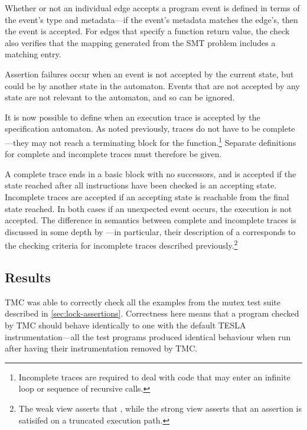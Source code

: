 Whether or not an individual edge accepts a program event is defined in terms of
the event's type and metadata---if the event's metadata matches the edge's, then
the event is accepted. For edges that specify a function return value, the check
also verifies that the mapping generated from the SMT problem includes a
matching entry.

Assertion failures occur when an event is not accepted by the current state, but
could be by another state in the automaton. Events that are not accepted by any
state are not relevant to the automaton, and so can be ignored.

It is now possible to define when an execution trace is accepted by the
specification automaton. As noted previously, traces do not have to be
complete---they may not reach a terminating block for the
function.\footnote{Incomplete traces are required to deal with code that may
enter an infinite loop or sequence of recursive calls.} Separate definitions for
complete and incomplete traces must therefore be given.

A complete trace ends in a basic block with no successors, and is accepted if
the state reached after all instructions have been checked is an accepting
state. Incomplete traces are accepted if an accepting state is reachable from
the final state reached. In both cases if an unexpected event occurs, the
execution is not accepted. The difference in semantics between complete and
incomplete traces is discussed in some depth by
\textcite{eisner_reasoning_2003}---in particular, their description of a
 corresponds to the checking criteria for incomplete traces
described previously.\footnote{The weak view asserts that
, while the
strong view asserts that an assertion is  satisifed on a
truncated execution path.}

\subsection{Results} \label{sec:model-limits}

TMC was able to correctly check all the examples from the mutex test suite
described in \autoref{sec:lock-assertions}. Correctness here means that a
program checked by TMC should behave identically to one with the default TESLA
instrumentation---all the test programs produced identical behaviour when run
after having their instrumentation removed by TMC.

